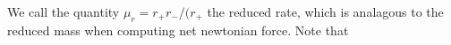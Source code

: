 We call the quantity \(\mu_r = r_+r_-/(r_+\) the reduced rate, which is analagous to the reduced mass when computing net newtonian force.  Note that